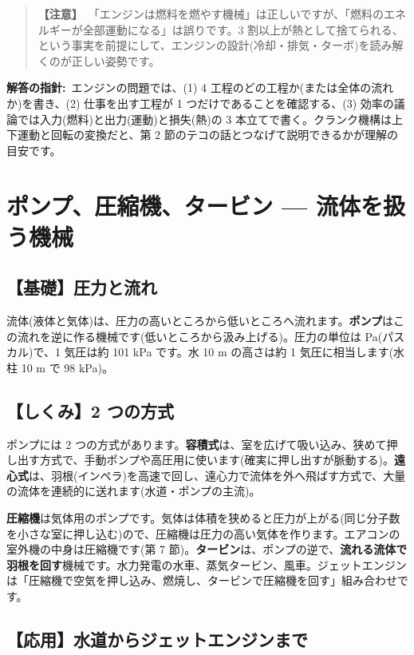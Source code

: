 \documentclass{article}
\begin{document}
\begin{quote}
\textbf{【注意】}\ 「エンジンは燃料を燃やす機械」は正しいですが、「燃料のエネルギーが全部運動になる」は誤りです。3 割以上が熱として捨てられる、という事実を前提にして、エンジンの設計(冷却・排気・ターボ)を読み解くのが正しい姿勢です。
\end{quote}

\textbf{解答の指針:}\ エンジンの問題では、(1) 4 工程のどの工程か(または全体の流れか)を書き、(2) 仕事を出す工程が 1 つだけであることを確認する、(3) 効率の議論では入力(燃料)と出力(運動)と損失(熱)の 3 本立てで書く。クランク機構は上下運動と回転の変換だと、第 2 節のテコの話とつなげて説明できるかが理解の目安です。

\section{ポンプ、圧縮機、タービン — 流体を扱う機械}

\subsection{【基礎】圧力と流れ}

流体(液体と気体)は、圧力の高いところから低いところへ流れます。\textbf{ポンプ}はこの流れを逆に作る機械です(低いところから汲み上げる)。圧力の単位は Pa(パスカル)で、1 気圧は約 101 kPa です。水 10 m の高さは約 1 気圧に相当します(水柱 10 m で 98 kPa)。

\subsection{【しくみ】2 つの方式}

ポンプには 2 つの方式があります。\textbf{容積式}は、室を広げて吸い込み、狭めて押し出す方式で、手動ポンプや高圧用に使います(確実に押し出すが脈動する)。\textbf{遠心式}は、羽根(インペラ)を高速で回し、遠心力で流体を外へ飛ばす方式で、大量の流体を連続的に送れます(水道・ポンプの主流)。

\textbf{圧縮機}は気体用のポンプです。気体は体積を狭めると圧力が上がる(同じ分子数を小さな室に押し込む)ので、圧縮機は圧力の高い気体を作ります。エアコンの室外機の中身は圧縮機です(第 7 節)。\textbf{タービン}は、ポンプの逆で、\textbf{流れる流体で羽根を回す}機械です。水力発電の水車、蒸気タービン、風車。ジェットエンジンは「圧縮機で空気を押し込み、燃焼し、タービンで圧縮機を回す」組み合わせです。

\subsection{【応用】水道からジェットエンジンまで}
\end{document}

